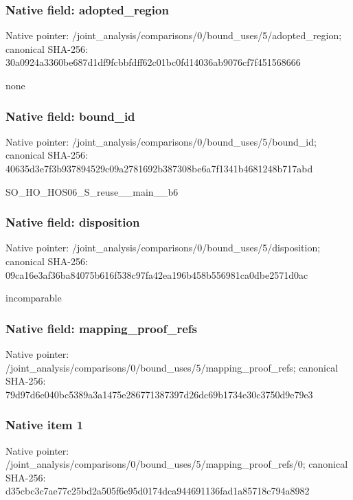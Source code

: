 \documentclass[10pt,a4paper]{article}
\begin{document}
\subsubsection{Native field: adopted\_\allowbreak{}region}
Native pointer: /joint\_\allowbreak{}analysis/comparisons/0/bound\_\allowbreak{}uses/5/adopted\_\allowbreak{}region; canonical SHA-256: 30a0924a3360be687d1df9fcbbfdff62c01bc0fd14036ab9076cf7f451568666

\begingroup\raggedright\sloppy none\par\endgroup

\subsubsection{Native field: bound\_\allowbreak{}id}
Native pointer: /joint\_\allowbreak{}analysis/comparisons/0/bound\_\allowbreak{}uses/5/bound\_\allowbreak{}id; canonical SHA-256: 40635d3e7f3b937894529c09a2781692b387308be6a7f1341b4681248b717abd

\begingroup\raggedright\sloppy SO\_\allowbreak{}HO\_\allowbreak{}HOS06\_\allowbreak{}S\_\allowbreak{}reuse\_\allowbreak{}\_\allowbreak{}main\_\allowbreak{}\_\allowbreak{}b6\par\endgroup

\subsubsection{Native field: disposition}
Native pointer: /joint\_\allowbreak{}analysis/comparisons/0/bound\_\allowbreak{}uses/5/disposition; canonical SHA-256: 09ca16e3af36ba84075b616f538c97fa42ea196b458b556981ca0dbe2571d0ac

\begingroup\raggedright\sloppy incomparable\par\endgroup

\subsubsection{Native field: mapping\_\allowbreak{}proof\_\allowbreak{}refs}
Native pointer: /joint\_\allowbreak{}analysis/comparisons/0/bound\_\allowbreak{}uses/5/mapping\_\allowbreak{}proof\_\allowbreak{}refs; canonical SHA-256: 79d97d6e040bc5389a3a1475e286771387397d26dc69b1734e30c3750d9e79e3

\subsubsection{Native item 1}
Native pointer: /joint\_\allowbreak{}analysis/comparisons/0/bound\_\allowbreak{}uses/5/mapping\_\allowbreak{}proof\_\allowbreak{}refs/0; canonical SHA-256: d35cbc3c7ae77c25bd2a505f6e95d0174dca944691136fad1a85718c794a8982
\end{document}
